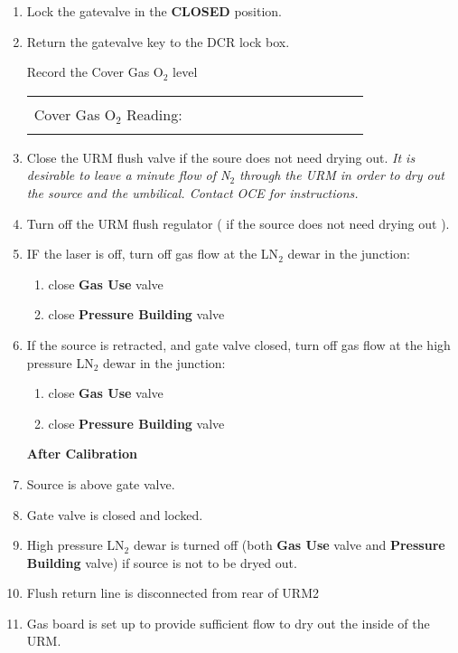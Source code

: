 \begin{enumerate}
\item\checkbox Lock the gatevalve in the {\bf CLOSED} position.
\item\checkbox Return the gatevalve key to the DCR lock box.

 \checkitem Record the Cover Gas O$_2$ level
     \begin{center}
     \begin{tabular}{|l|}
     \hline
      \\
     Cover Gas O$_2$ Reading:~~~~~~~~~~~~~~~~~~~~~~~~\\
      \\
     \hline
     \end{tabular}
     \end{center}

\item\checkbox Close the URM flush valve if the soure does not need drying out.
\small
{\em It is desirable to leave a minute flow of N$_2$ through the URM in order to dry
out the source and the umbilical. Contact OCE for instructions.}

\normalsize
\item\checkbox Turn off the URM flush regulator ( if the source does not need drying out ).

\item\checkbox IF the laser is off,
   turn off gas flow at the LN$_2$ dewar in the junction:
   \begin{enumerate}
   \item close {\bf Gas Use} valve
   \item close {\bf Pressure Building} valve
   \end{enumerate}


 \item\checkbox If the source is retracted, and gate valve closed,
   turn off gas flow at the high pressure LN$_2$ dewar in the junction:
   \begin{enumerate}
   \item close {\bf Gas Use} valve
   \item close {\bf Pressure Building} valve
   \end{enumerate}






\begin{center}
           {\bf After Calibration}
\end{center}
\item\checkbox Source is above gate valve.
\item\checkbox Gate valve is closed and locked.
\item\checkbox High pressure LN$_2$ dewar is turned off (both {\bf Gas Use} valve and
  {\bf Pressure Building} valve) if source is not to be dryed out.
\item\checkbox Flush return line is disconnected from rear of URM2
\item\checkbox Gas board is set up to provide sufficient flow to dry out the inside
of the URM.

\end{enumerate}



